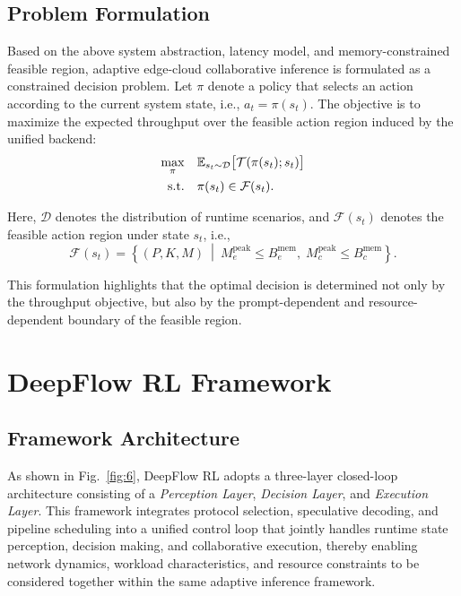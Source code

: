 \documentclass[a4paper,fleqn]{cas-dc}
\begin{document}
\subsection{Problem Formulation}

Based on the above system abstraction, latency model, and memory-constrained feasible region, adaptive edge-cloud collaborative inference is formulated as a constrained decision problem. Let $\pi$ denote a policy that selects an action according to the current system state, i.e., $a_t = \pi(s_t)$. The objective is to maximize the expected throughput over the feasible action region induced by the unified backend:
\begin{align}
\max_{\pi} \quad & \mathbb{E}_{s_t \sim \mathcal{D}} \big[\mathcal{T}(\pi(s_t); s_t)\big] \\
\text{s.t.} \quad & \pi(s_t) \in \mathcal{F}(s_t). \notag
\end{align}

Here, $\mathcal{D}$ denotes the distribution of runtime scenarios, and $\mathcal{F}(s_t)$ denotes the feasible action region under state $s_t$, i.e.,
\begin{equation}
\mathcal{F}(s_t)=
\left\{
(P,K,M)\ \middle|\
M_e^{\mathrm{peak}} \leq B_e^{\mathrm{mem}},
\;
M_c^{\mathrm{peak}} \leq B_c^{\mathrm{mem}}
\right\}.
\end{equation}

This formulation highlights that the optimal decision is determined not only by the throughput objective, but also by the prompt-dependent and resource-dependent boundary of the feasible region.

\section{DeepFlow RL Framework}

\subsection{Framework Architecture}

As shown in Fig.~\ref{fig:6}, DeepFlow RL adopts a three-layer closed-loop architecture consisting of a \emph{Perception Layer}, \emph{Decision Layer}, and \emph{Execution Layer}. This framework integrates protocol selection, speculative decoding, and pipeline scheduling into a unified control loop that jointly handles runtime state perception, decision making, and collaborative execution, thereby enabling network dynamics, workload characteristics, and resource constraints to be considered together within the same adaptive inference framework.
\end{document}
